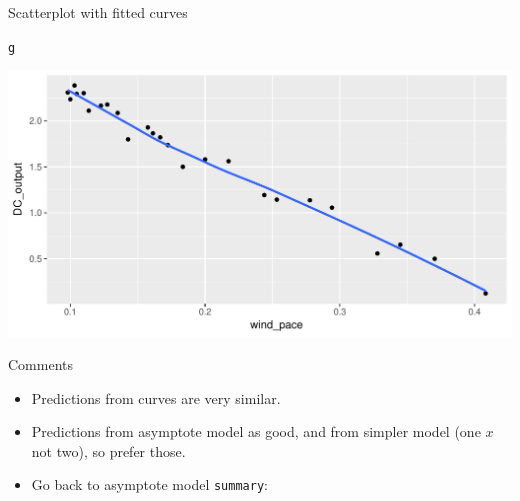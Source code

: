 \documentclass[unknownkeysallowed]{beamer}\usepackage[]{graphicx}\usepackage[]{color}
\makeatletter
\def\maxwidth{ %
  \ifdim\Gin@nat@width>\linewidth
    \linewidth
  \else
    \Gin@nat@width
  \fi
}
\newcommand{\hlstd}[1]{\textcolor[rgb]{0.345,0.345,0.345}{#1}}%
\newenvironment{kframe}{%
 \def\at@end@of@kframe{}%
 \ifinner\ifhmode%
  \def\at@end@of@kframe{\end{minipage}}%
  \begin{minipage}{\columnwidth}%
 \fi\fi%
 \def\FrameCommand##1{\hskip\@totalleftmargin \hskip-\fboxsep
 \colorbox{shadecolor}{##1}\hskip-\fboxsep
     \hskip-\linewidth \hskip-\@totalleftmargin \hskip\columnwidth}%
 \MakeFramed {\advance\hsize-\width
   \@totalleftmargin\z@ \linewidth\hsize
   \@setminipage}}%
 {\par\unskip\endMakeFramed%
 \at@end@of@kframe}
\newenvironment{knitrout}{}{} %
\makeatother
\begin{document}
\begin{frame}[fragile]{Scatterplot with fitted curves}

\begin{knitrout}
\color{fgcolor}\begin{kframe}
\begin{alltt}
\hlstd{g}
\end{alltt}
\end{kframe}
\includegraphics[width=\maxwidth]{figure/unnamed-chunk-253-1} 

\end{knitrout}
  
\end{frame}

\begin{frame}[fragile]{Comments}

  \begin{itemize}
  \item Predictions from curves are very similar.
  \item Predictions from asymptote model as good, and from simpler
    model (one $x$ not two), so prefer those.
  \item Go back to asymptote model \texttt{summary}:
  \end{itemize}
  
\end{frame}
\end{document}
